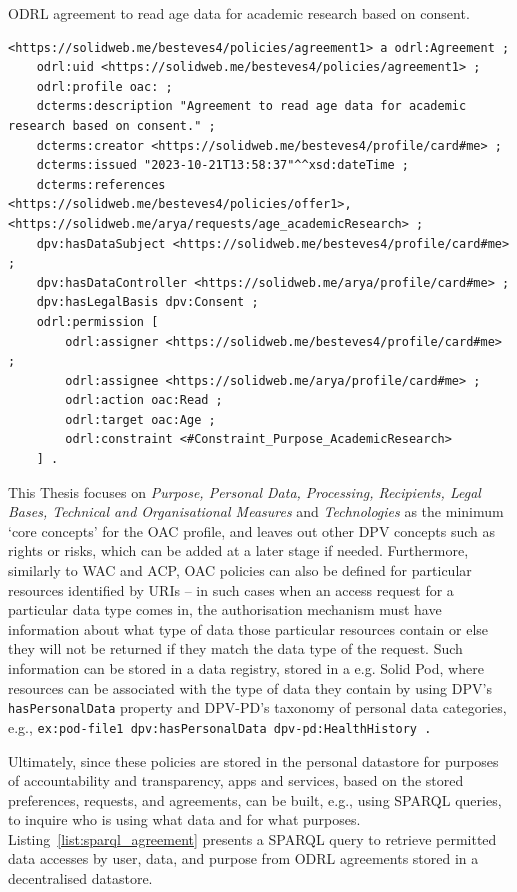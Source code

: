 \begin{listing}[ht]
\caption[ODRL agreement.]{ODRL agreement to read age data for academic research based on consent.}
\label{list:oac_agreement}
\begin{verbatim}
<https://solidweb.me/besteves4/policies/agreement1> a odrl:Agreement ;
    odrl:uid <https://solidweb.me/besteves4/policies/agreement1> ;
    odrl:profile oac: ;
    dcterms:description "Agreement to read age data for academic research based on consent." ;
    dcterms:creator <https://solidweb.me/besteves4/profile/card#me> ;
    dcterms:issued "2023-10-21T13:58:37"^^xsd:dateTime ;
    dcterms:references <https://solidweb.me/besteves4/policies/offer1>, <https://solidweb.me/arya/requests/age_academicResearch> ;
    dpv:hasDataSubject <https://solidweb.me/besteves4/profile/card#me> ;
    dpv:hasDataController <https://solidweb.me/arya/profile/card#me> ;
    dpv:hasLegalBasis dpv:Consent ;
    odrl:permission [
        odrl:assigner <https://solidweb.me/besteves4/profile/card#me> ;
        odrl:assignee <https://solidweb.me/arya/profile/card#me> ;
        odrl:action oac:Read ;
        odrl:target oac:Age ;
        odrl:constraint <#Constraint_Purpose_AcademicResearch>
    ] .
\end{verbatim}
\end{listing}

This Thesis focuses on \textit{Purpose, Personal Data, Processing, Recipients, Legal Bases, Technical and Organisational Measures} and \textit{Technologies} as the minimum `core concepts' for the OAC profile, and leaves out other DPV concepts such as rights or risks, which can be added at a later stage if needed.
Furthermore, similarly to WAC and ACP, OAC policies can also be defined for particular resources identified by URIs -- in such cases when an access request for a particular data type comes in, the authorisation mechanism must have information about what type of data those particular resources contain or else they will not be returned if they match the data type of the request.
Such information can be stored in a data registry, stored in a e.g. Solid Pod, where resources can be associated with the type of data they contain by using DPV's \texttt{hasPersonalData} property and DPV-PD's taxonomy of personal data categories, e.g., \texttt{ex:pod-file1 dpv:hasPersonalData dpv-pd:HealthHistory .}

Ultimately, since these policies are stored in the personal datastore for purposes of accountability and transparency, apps and services, based on the stored preferences, requests, and agreements, can be built, e.g., using SPARQL queries, to inquire who is using what data and for what purposes.
Listing~\ref{list:sparql_agreement} presents a SPARQL query to retrieve permitted data accesses by user, data, and purpose from ODRL agreements stored in a decentralised datastore.

